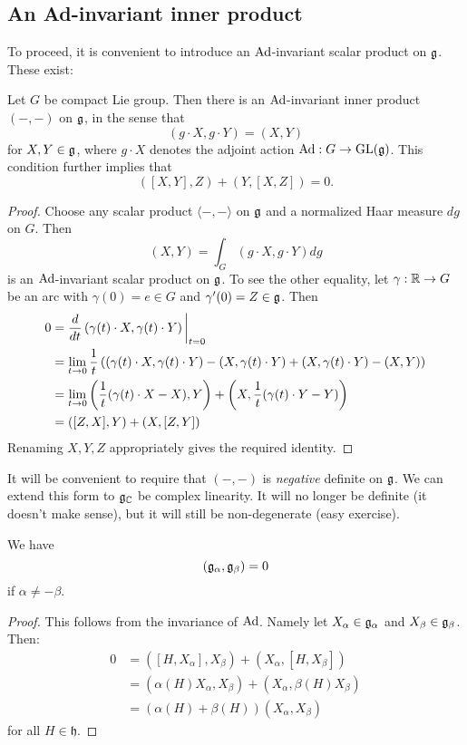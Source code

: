 \documentclass[11pt, english]{article}
\begin{document}
\subsection{An Ad-invariant inner product}

To proceed, it is convenient to introduce an $\operatorname{Ad}$-invariant scalar product on $\mathfrak g$. These exist:

\begin{lemma}
\label{lemmainnerproduct}
Let $G$ be compact Lie group. Then there is an $\operatorname{Ad}$-invariant inner product $( -,-)$ on $\mathfrak g$, in the sense that $$( g \cdot X, g\cdot Y )  = (X , Y )$$
for $X,Y \in \mathfrak g$, where $g \cdot X$ denotes the adjoint action $\operatorname{Ad}:G \to \operatorname{GL}(\mathfrak g)$. This condition further implies that
$$
( [X,Y],Z )  +(Y,[X,Z]) = 0.
$$
\end{lemma}
\begin{proof}
 Choose any scalar product $\langle -,-\rangle $ on $\mathfrak g$ and a normalized Haar measure $dg$ on $G$. Then 
$$
(X,Y ) = \int_G (g \cdot X, g\cdot Y) dg
$$
is an $\operatorname{Ad}$-invariant scalar product on $\mathfrak g$. To see the other equality, let $\gamma:\mathbb{R} \to G$ be an arc with $\gamma(0)=e \in G$ and $\gamma'(0)=Z \in \mathfrak g$. Then
\begin{align*}
0 &=   \restr{\frac{d}{dt}\left( \gamma(t) \cdot X, \gamma(t) \cdot Y \right)}{t = 0} \\
 &= \lim_{t \to 0} \frac 1t \left(( \gamma(t) \cdot X, \gamma(t) \cdot Y ) - ( X, \gamma(t) \cdot  Y ) + ( X, \gamma(t) \cdot Y ) - ( X, Y ) \right) \\
&= \lim_{t \to 0} \left( \frac 1t (\gamma(t) \cdot X - X), Y \right) + \left( X, \frac 1t (\gamma(t) \cdot Y - Y) \right) \\
&= ( [Z,X],Y ) + ( X, [Z,Y])
\end{align*}
Renaming $X,Y,Z$ appropriately gives the required identity.
\end{proof}

It will be convenient to require that $( -,- )$ is \emph{negative} definite on $\mathfrak g$. We can extend this form to $\mathfrak g_{\mathbb{C}}$ be complex linearity. It will no longer be definite (it doesn't make sense), but it will still be non-degenerate (easy exercise). 

\begin{lemma}
We have
$$
(\mathfrak g_\alpha, \mathfrak g_\beta ) = 0
$$
if $\alpha \neq -\beta$.
\end{lemma}
\begin{proof}
This follows from the invariance of $\operatorname{Ad}$. Namely let $X_\alpha \in \mathfrak g_\alpha$ and $X_\beta \in \mathfrak g_\beta$. Then:
\begin{align*}
  0 &= ([H,X_\alpha],X_\beta ) + (X_\alpha,[H,X_\beta]) \\
&= (\alpha(H)X_\alpha, X_\beta) + (X_\alpha,\beta(H)X_\beta) \\
&= (\alpha(H)+\beta(H)) (X_\alpha,X_\beta)
\end{align*}
for all $H \in \mathfrak h$.
\end{proof}
\end{document}
